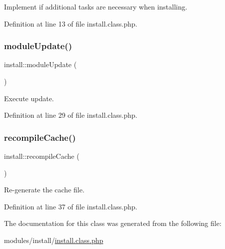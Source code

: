 Implement if additional tasks are necessary when installing. 



Definition at line 13 of file install.\+class.\+php.

\hypertarget{classinstall_abb5fea730938b38d5347c4ff44644f2d}{}\label{classinstall_abb5fea730938b38d5347c4ff44644f2d} 
\subsubsection{\texorpdfstring{module\+Update()}{moduleUpdate()}}
{\footnotesize\ttfamily install\+::module\+Update (\begin{DoxyParamCaption}{ }\end{DoxyParamCaption})}



Execute update. 



Definition at line 29 of file install.\+class.\+php.

\hypertarget{classinstall_ac0cf9a2eedd8ed9f01b9d848157403d8}{}\label{classinstall_ac0cf9a2eedd8ed9f01b9d848157403d8} 
\subsubsection{\texorpdfstring{recompile\+Cache()}{recompileCache()}}
{\footnotesize\ttfamily install\+::recompile\+Cache (\begin{DoxyParamCaption}{ }\end{DoxyParamCaption})}



Re-\/generate the cache file. 



Definition at line 37 of file install.\+class.\+php.



The documentation for this class was generated from the following file\+:\begin{DoxyCompactItemize}
\item 
modules/install/\hyperlink{install_8class_8php}{install.\+class.\+php}\end{DoxyCompactItemize}
